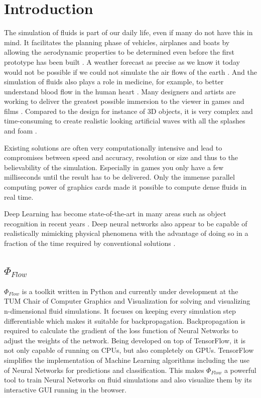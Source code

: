 \chapter{Introduction}\label{chapter:introduction}
The simulation of fluids is part of our daily life, even if many do not have this in mind. It facilitates the planning phase of vehicles, airplanes and boats by allowing the aerodynamic properties to be determined even before the first prototype has been built \parencite{tsubokura2009computational}. A weather forecast as precise as we know it today would not be possible if we could not simulate the air flows of the earth \parencite{kimura2002numerical}. And the simulation of fluids also plays a role in medicine, for example, to better understand blood flow in the human heart \parencite{peskin1977numerical}. Many designers and artists are working to deliver the greatest possible immersion to the viewer in games and films \parencite{gilland2009elemental}. Compared to the design for instance of 3D objects, it is very complex and time-consuming to create realistic looking artificial waves with all the splashes and foam \parencite{gilland2009elemental}.
\par Existing solutions are often very computationally intensive and lead to compromises between speed and accuracy, resolution or size and thus to the believability of the simulation. Especially in games you only have a few milliseconds until the result has to be delivered. Only the immense parallel computing power of graphics cards made it possible to compute dense fluids in real time. 
\par Deep Learning has become state-of-the-art in many areas such as object recognition in recent years \parencite{lecun2015deep}. Deep neural networks also appear to be capable of realistically mimicking physical phenomena with the advantage of doing so in a fraction of the time required by conventional solutions \parencite{tompson2017accelerating} \parencite{thuerey2018well}.
\section{$\Phi_\textit{Flow}$ }
$\Phi_\textit{Flow}$ is a toolkit written in Python and currently under development at the TUM Chair of Computer Graphics and Visualization for solving and visualizing n-dimensional fluid simulations. It focuses on keeping every simulation step differentiable which makes it suitable for backpropagation. Backpropagation is required to calculate the gradient of the loss function of Neural Networks to adjust the weights of the network. Being developed on top of TensorFlow, it is not only capable of running on CPUs, but also completely on GPUs. TensorFlow simplifies the implementation of Machine Learning algorithms including the use of Neural Networks for predictions and classification. This makes $\Phi_\textit{Flow}$ a powerful tool to train Neural Networks on fluid simulations and also visualize them by its interactive GUI running in the browser. 
